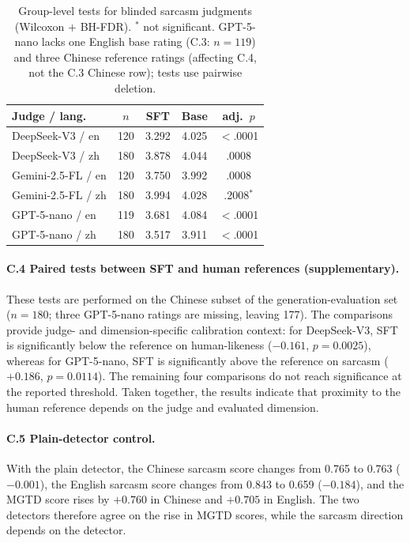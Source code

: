 \begin{table}[h]
  \centering
  \small
  \begin{tabular}{@{}p{2.4cm}cccc@{}}
    \toprule
    \textbf{Judge / lang.} & \textbf{$n$} & \textbf{SFT} & \textbf{Base} & \textbf{adj.\ $p$} \\
    \midrule
    DeepSeek-V3 / en & 120 & 3.292 & 4.025 & $<$.0001 \\
    DeepSeek-V3 / zh & 180 & 3.878 & 4.044 & .0008 \\
    Gemini-2.5-FL / en & 120 & 3.750 & 3.992 & .0008 \\
    Gemini-2.5-FL / zh & 180 & 3.994 & 4.028 & .2008$^{\ast}$ \\
    GPT-5-nano / en & 119 & 3.681 & 4.084 & $<$.0001 \\
    GPT-5-nano / zh & 180 & 3.517 & 3.911 & $<$.0001 \\
    \bottomrule
  \end{tabular}
  \caption{Group-level tests for blinded sarcasm judgments (Wilcoxon $+$ BH-FDR). $^{\ast}$ not significant. GPT-5-nano lacks one English base rating (C.3: $n=119$) and three Chinese reference ratings (affecting C.4, not the C.3 Chinese row); tests use pairwise deletion.}
  \label{tab:group-tests}
\end{table}

\paragraph{C.4 Paired tests between SFT and human references (supplementary).} These tests are performed on the Chinese subset of the generation-evaluation set ($n = 180$; three GPT-5-nano ratings are missing, leaving 177). The comparisons provide judge- and dimension-specific calibration context: for DeepSeek-V3, SFT is significantly below the reference on human-likeness ($-0.161$, $p = 0.0025$), whereas for GPT-5-nano, SFT is significantly above the reference on sarcasm ($+0.186$, $p = 0.0114$). The remaining four comparisons do not reach significance at the reported threshold. Taken together, the results indicate that proximity to the human reference depends on the judge and evaluated dimension.

\paragraph{C.5 Plain-detector control.} With the plain detector, the Chinese sarcasm score changes from 0.765 to 0.763 ($-0.001$), the English sarcasm score changes from 0.843 to 0.659 ($-0.184$), and the MGTD score rises by $+0.760$ in Chinese and $+0.705$ in English. The two detectors therefore agree on the rise in MGTD scores, while the sarcasm direction depends on the detector.

